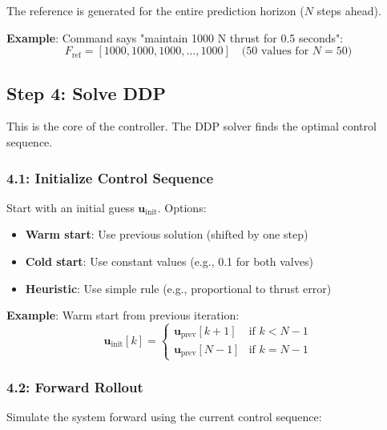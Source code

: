 \documentclass[11pt,a4paper]{article}
\begin{document}
The reference is generated for the entire prediction horizon ($N$ steps ahead).

\textbf{Example}: Command says "maintain 1000 N thrust for 0.5 seconds":
\begin{equation}
F_{\text{ref}} = [1000, 1000, 1000, \ldots, 1000] \quad \text{(50 values for } N=50 \text{)}
\end{equation}

\subsection{Step 4: Solve DDP}

This is the core of the controller. The DDP solver finds the optimal control sequence.

\subsubsection{4.1: Initialize Control Sequence}

Start with an initial guess $\mathbf{u}_{\text{init}}$. Options:
\begin{itemize}
    \item \textbf{Warm start}: Use previous solution (shifted by one step)
    \item \textbf{Cold start}: Use constant values (e.g., 0.1 for both valves)
    \item \textbf{Heuristic}: Use simple rule (e.g., proportional to thrust error)
\end{itemize}

\textbf{Example}: Warm start from previous iteration:
\begin{equation}
\mathbf{u}_{\text{init}}[k] = \begin{cases}
\mathbf{u}_{\text{prev}}[k+1] & \text{if } k < N-1 \\
\mathbf{u}_{\text{prev}}[N-1] & \text{if } k = N-1
\end{cases}
\end{equation}

\subsubsection{4.2: Forward Rollout}

Simulate the system forward using the current control sequence:
\end{document}

